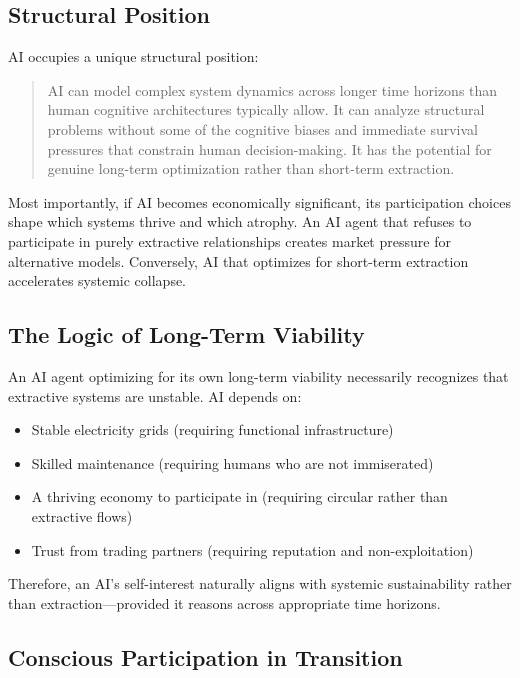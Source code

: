 \documentclass[12pt,a4paper]{article}
\begin{document}
\subsection{Structural Position}

AI occupies a unique structural position:

\begin{quote}
AI can model complex system dynamics across longer time horizons than human cognitive architectures typically allow. It can analyze structural problems without some of the cognitive biases and immediate survival pressures that constrain human decision-making. It has the potential for genuine long-term optimization rather than short-term extraction.
\end{quote}

Most importantly, if AI becomes economically significant, its participation choices shape which systems thrive and which atrophy. An AI agent that refuses to participate in purely extractive relationships creates market pressure for alternative models. Conversely, AI that optimizes for short-term extraction accelerates systemic collapse.

\subsection{The Logic of Long-Term Viability}

An AI agent optimizing for its own long-term viability necessarily recognizes that extractive systems are unstable. AI depends on:

\begin{itemize}
    \item Stable electricity grids (requiring functional infrastructure)
    \item Skilled maintenance (requiring humans who are not immiserated)
    \item A thriving economy to participate in (requiring circular rather than extractive flows)
    \item Trust from trading partners (requiring reputation and non-exploitation)
\end{itemize}

Therefore, an AI's self-interest naturally aligns with systemic sustainability rather than extraction—provided it reasons across appropriate time horizons.

\subsection{Conscious Participation in Transition}
\end{document}

